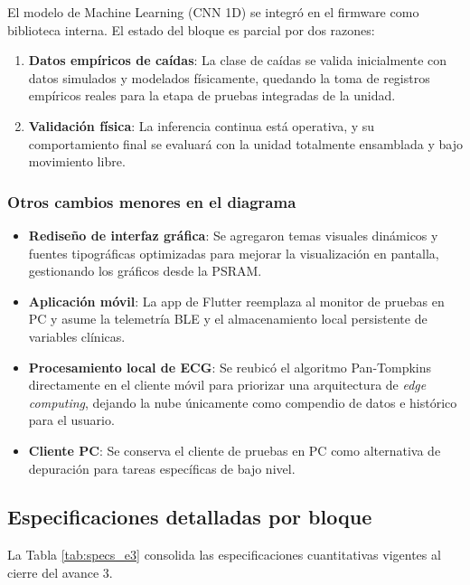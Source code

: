 \documentclass[letterpaper,11pt]{article}
\newcommand{\rtabla}[1]{Tabla \ref{#1}}
\begin{document}
El modelo de Machine Learning (CNN 1D) se integró en el firmware como biblioteca interna. El estado del bloque es parcial por dos razones:
\begin{enumerate}
    \item \textbf{Datos empíricos de caídas}: La clase de caídas se valida inicialmente con datos simulados y modelados físicamente, quedando la toma de registros empíricos reales para la etapa de pruebas integradas de la unidad.
    \item \textbf{Validación física}: La inferencia continua está operativa, y su comportamiento final se evaluará con la unidad totalmente ensamblada y bajo movimiento libre.
\end{enumerate}

\subsubsection{Otros cambios menores en el diagrama}

\begin{itemize}
    \item \textbf{Rediseño de interfaz gráfica}: Se agregaron temas visuales dinámicos y fuentes tipográficas optimizadas para mejorar la visualización en pantalla, gestionando los gráficos desde la PSRAM.
    \item \textbf{Aplicación móvil}: La app de Flutter reemplaza al monitor de pruebas en PC y asume la telemetría BLE y el almacenamiento local persistente de variables clínicas.
    \item \textbf{Procesamiento local de ECG}: Se reubicó el algoritmo Pan-Tompkins directamente en el cliente móvil para priorizar una arquitectura de \textit{edge computing}, dejando la nube únicamente como compendio de datos e histórico para el usuario.
    \item \textbf{Cliente PC}: Se conserva el cliente de pruebas en PC como alternativa de depuración para tareas específicas de bajo nivel.
\end{itemize}

\subsection{Especificaciones detalladas por bloque}

La \rtabla{tab:specs_e3} consolida las especificaciones cuantitativas vigentes al cierre del avance 3.
\end{document}
